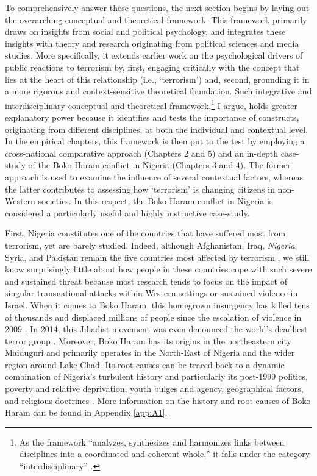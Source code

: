 To comprehensively answer these questions, the next section begins by laying out the overarching conceptual and theoretical framework. This framework primarily draws on insights from social and political psychology, and integrates these insights with theory and research originating from political sciences and media studies. More specifically, it extends earlier work on the psychological drivers of public reactions to terrorism by, first, engaging critically with the concept that lies at the heart of this relationship (i.e., ‘terrorism’) and, second, grounding it in a more rigorous and context-sensitive theoretical foundation. Such integrative and interdisciplinary conceptual and theoretical framework,\footnote{As the framework ``analyzes, synthesizes and harmonizes links between disciplines into a coordinated and coherent whole,'' it falls under the category ``interdisciplinary'' \citep[][p. 351]{Choi2006}.} I argue, holds greater explanatory power because it identifies and tests the importance of constructs, originating from different disciplines, at both the individual and contextual level. In the empirical chapters, this framework is then put to the test by employing a cross-national comparative approach (Chapters 2 and 5) and an in-depth case-study of the Boko Haram conflict in Nigeria (Chapters 3 and 4). The former approach is used to examine the influence of several contextual factors, whereas the latter contributes to assessing how `terrorism' is changing citizens in non-Western societies. In this respect, the Boko Haram conflict in Nigeria is considered a particularly useful and highly instructive case-study. 


First, Nigeria constitutes one of the countries that have suffered most from terrorism, yet are barely studied. Indeed, although Afghanistan, Iraq, \textit{Nigeria}, Syria, and Pakistan remain the five countries most affected by terrorism \citep{TheInstituteForEconomicsAndPeace2019}, we still know surprisingly little about how people in these countries cope with such severe and sustained threat because most research tends to focus on the impact of singular transnational attacks within Western settings or sustained violence in Israel. When it comes to Boko Haram, this homegrown insurgency has killed tens of thousands and displaced millions of people since the escalation of violence in 2009 \citep{Campbell2019}. In 2014, this Jihadist movement was even denounced the world's deadliest terror group \citep{InstituteforEconomics&Peace2015}. Moreover, Boko Haram has its origins in the northeastern city Maiduguri and primarily operates in the North-East of Nigeria and the wider region around Lake Chad. Its root causes can be traced back to a dynamic combination of Nigeria's turbulent history and particularly its post-1999 politics, poverty and relative deprivation, youth bulges and agency, geographical factors, and religious doctrines \citep{Mustapha2014b, Thurston2018, Onuoha2010, Onuoha2012}. More information on the history and root causes of Boko Haram can be found in Appendix \ref{app:A1}.


